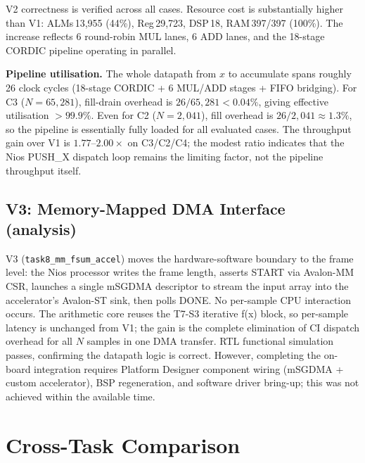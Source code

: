 \documentclass[a4paper,10pt,twocolumn]{article}
\begin{document}
V2 correctness is verified across all cases. Resource cost is substantially higher than V1: ALMs\,13{,}955 (44\%), Reg\,29{,}723, DSP\,18, RAM\,397/397 (100\%). The increase reflects 6 round-robin MUL lanes, 6 ADD lanes, and the 18-stage CORDIC pipeline operating in parallel.

\textbf{Pipeline utilisation.} The whole datapath from $x$ to accumulate spans roughly 26 clock cycles (18-stage CORDIC + 6 MUL/ADD stages + FIFO bridging). For C3 ($N=65{,}281$), fill-drain overhead is $26/65{,}281 < 0.04\%$, giving effective utilisation $>99.9\%$. Even for C2 ($N=2{,}041$), fill overhead is $26/2{,}041 \approx 1.3\%$, so the pipeline is essentially fully loaded for all evaluated cases. The throughput gain over V1 is $1.77\text{--}2.00\times$ on C3/C2/C4; the modest ratio indicates that the Nios PUSH\_X dispatch loop remains the limiting factor, not the pipeline throughput itself.

\subsection{V3: Memory-Mapped DMA Interface (analysis)}
V3 (\texttt{task8\_mm\_fsum\_accel}) moves the hardware-software boundary to the frame level: the Nios processor writes the frame length, asserts START via Avalon-MM CSR, launches a single mSGDMA descriptor to stream the input array into the accelerator's Avalon-ST sink, then polls DONE. No per-sample CPU interaction occurs. The arithmetic core reuses the T7-S3 iterative f(x) block, so per-sample latency is unchanged from V1; the gain is the complete elimination of CI dispatch overhead for all $N$ samples in one DMA transfer. RTL functional simulation passes, confirming the datapath logic is correct. However, completing the on-board integration requires Platform Designer component wiring (mSGDMA + custom accelerator), BSP regeneration, and software driver bring-up; this was not achieved within the available time.

\section{Cross-Task Comparison}
\end{document}
